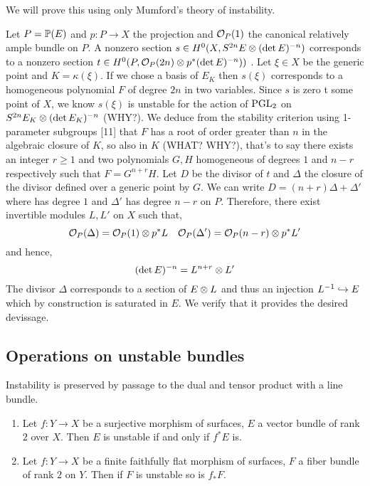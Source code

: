 \documentclass[12pt]{article}
\newcommand{\cO}{\mathcal{O}}
\begin{document}
We will prove this using only Mumford's theory of instability.
\par 
Let $P = \P(E)$ and $p : P \to X$ the projection and $\struct{P}(1)$ the canonical relatively ample bundle on $P$. A nonzero section $s \in H^0(X, S^{2n} E \ot (\det{E})^{-n})$ corresponds to a nonzero section $t \in H^0(P, \struct{P}(2n) \ot p^* (\det{E})^{-n}))$ . Let $\xi \in X$ be the generic point and $K = \kappa(\xi)$. If we chose a basis of $E_K$ then $s(\xi)$ corresponds to a homogeneous polynomial $F$ of degree $2n$ in two variables. Since $s$ is zero t some point of $X$, we know $s(\xi)$ is unstable for the action of $\PGL_2$ on $S^{2n} E_K \ot (\det{E_K})^{-n}$ (WHY?). We deduce from the stability criterion using 1-parameter subgroups [11] that $F$ has a root of order greater than $n$ in the algebraic closure of $K$, so also in $K$ (WHAT? WHY?), that's to say there exists an integer $r \ge 1$ and two polynomials $G, H$ homogeneous of degrees $1$ and $n-r$ respectively such that $F = G^{n+r} H$. Let $D$ be the divisor of $t$ and $\Delta$ the closure of the divisor defined over a generic point by $G$. We can write $D = (n + r) \Delta + \Delta'$ where has degree $1$ and $\Delta'$ has degree $n - r$ on $P$. Therefore, there exist invertible modules $L, L'$ on $X$ such that,
\[ \struct{P}(\Delta) = \struct{P}(1) \ot p^* L \quad \cO_P(\Delta') = \cO_P(n-r) \ot p^* L' \]
and hence,
\[ (\det{E})^{-n} = L^{n+r} \ot L' \]
The divisor $\Delta$ corresponds to a section of $E \ot L$ and thus an injection $L^{-1} \embed E$ which by construction is saturated in $E$. We verify that it provides the desired devissage. 


\subsection{Operations on unstable bundles}

Instability is preserved by passage to the dual and tensor product with a line bundle. 

\begin{enumerate}
\item Let $f : Y \to X$ be a surjective morphism of surfaces, $E$ a vector bundle of rank $2$ over $X$. Then $E$ is unstable if and only if $f^* E$ is. 

\item Let $f : Y \to X$ be a finite faithfully flat morphism of surfaces, $F$ a fiber bundle of rank $2$ on $Y$. Then if $F$ is unstable so is $f_* F$.
\end{enumerate}
\end{document}
